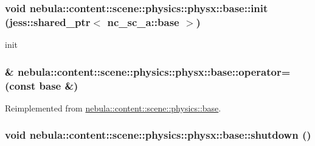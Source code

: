 \hypertarget{classnebula_1_1content_1_1scene_1_1physics_1_1physx_1_1base_a472a4fa7d840b99f2a201ca2653c645c}{
\subsubsection[{init}]{\setlength{\rightskip}{0pt plus 5cm}void nebula::content::scene::physics::physx::base::init (jess::shared\_\-ptr$<$ {\bf nc\_\-sc\_\-a::base} $>$)}}
\label{classnebula_1_1content_1_1scene_1_1physics_1_1physx_1_1base_a472a4fa7d840b99f2a201ca2653c645c}


init \hypertarget{classnebula_1_1content_1_1scene_1_1physics_1_1physx_1_1base_a99e5ed530c33163792b0c8b112360dc3}{
\subsubsection[{operator=}]{\& nebula::content::scene::physics::physx::base::operator= (const {\bf base} \&)}}
\label{classnebula_1_1content_1_1scene_1_1physics_1_1physx_1_1base_a99e5ed530c33163792b0c8b112360dc3}


Reimplemented from \hyperlink{classnebula_1_1content_1_1scene_1_1physics_1_1base_a3173307ffd379b5d89a0d14b92931974}{nebula::content::scene::physics::base}.\hypertarget{classnebula_1_1content_1_1scene_1_1physics_1_1physx_1_1base_ac445f0b82db1cb5aa6f8a79990a4bab2}{
\subsubsection[{shutdown}]{\setlength{\rightskip}{0pt plus 5cm}void nebula::content::scene::physics::physx::base::shutdown ()}}
\label{classnebula_1_1content_1_1scene_1_1physics_1_1physx_1_1base_ac445f0b82db1cb5aa6f8a79990a4bab2}


